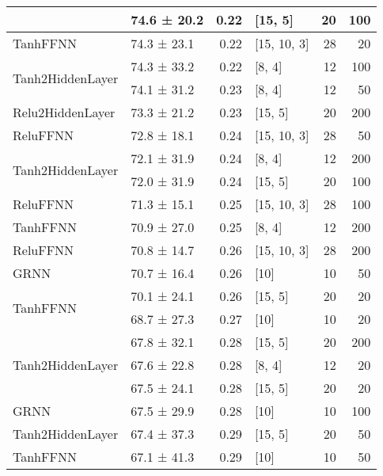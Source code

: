 \begin{table*}[h]
\begin{tabular}{llrlrr}
         & 74.6 ± 20.2 &  0.22 & [15, 5]        &         20 &      100 \\
 \hline
TanhFFNN         & 74.3 ± 23.1 &  0.22 & [15, 10, 3]    &         28 &       20 \\
 \hline
\multirow{2}{*}{Tanh2HiddenLayer}         & 74.3 ± 33.2 &  0.22 & [8, 4]         &         12 &      100 \\
         & 74.1 ± 31.2 &  0.23 & [8, 4]         &         12 &       50 \\
 \hline
Relu2HiddenLayer         & 73.3 ± 21.2 &  0.23 & [15, 5]        &         20 &      200 \\
 \hline
ReluFFNN         & 72.8 ± 18.1 &  0.24 & [15, 10, 3]    &         28 &       50 \\
 \hline
\multirow{2}{*}{Tanh2HiddenLayer}         & 72.1 ± 31.9 &  0.24 & [8, 4]         &         12 &      200 \\
         & 72.0 ± 31.9 &  0.24 & [15, 5]        &         20 &      100 \\
 \hline
ReluFFNN         & 71.3 ± 15.1 &  0.25 & [15, 10, 3]    &         28 &      100 \\
 \hline
TanhFFNN         & 70.9 ± 27.0 &  0.25 & [8, 4]         &         12 &      200 \\
 \hline
ReluFFNN         & 70.8 ± 14.7 &  0.26 & [15, 10, 3]    &         28 &      200 \\
 \hline
GRNN         & 70.7 ± 16.4 &  0.26 & [10]           &         10 &       50 \\
 \hline
\multirow{2}{*}{TanhFFNN}         & 70.1 ± 24.1 &  0.26 & [15, 5]        &         20 &       20 \\
         & 68.7 ± 27.3 &  0.27 & [10]           &         10 &       20 \\
 \hline
\multirow{3}{*}{Tanh2HiddenLayer}         & 67.8 ± 32.1 &  0.28 & [15, 5]        &         20 &      200 \\
         & 67.6 ± 22.8 &  0.28 & [8, 4]         &         12 &       20 \\
         & 67.5 ± 24.1 &  0.28 & [15, 5]        &         20 &       20 \\
 \hline
GRNN         & 67.5 ± 29.9 &  0.28 & [10]           &         10 &      100 \\
 \hline
Tanh2HiddenLayer         & 67.4 ± 37.3 &  0.29 & [15, 5]        &         20 &       50 \\
 \hline
TanhFFNN         & 67.1 ± 41.3 &  0.29 & [10]           &         10 &       50 \\

\end{tabular}
\end{table*}
